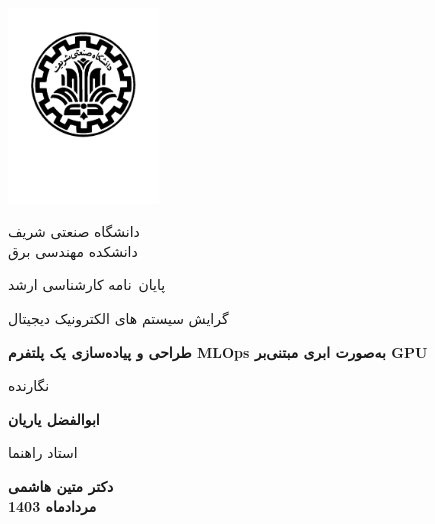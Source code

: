 

\thispagestyle{empty}
{\centering
	\mainjeldfont
	\vspace*{-2.5cm}
	\begin{latin}
		\centering
		\includegraphics[width=4cm]{Sharif_Logo.pdf}
	\end{latin}
	
	\vspace*{-2cm}
	
	{\Large دانشگاه صنعتی شریف \\ \vspace{0mm} \large دانشکده مهندسی برق}
	
	\vspace{1.4cm}
	
	{\large پایان~نامه کارشناسی ارشد\par} 
	{\large  گرایش سیستم های الکترونیک دیجیتال\par}  
	\vspace{1.3cm}
	{\Huge \textbf{طراحی و پیاده‌سازی یک پلتفرم MLOps به‌صورت ابری مبتنی‌بر GPU} }\par
	
	\vfil
	{\fieldnamefont نگارنده} \par
	{\Large\textbf{ابوالفضل یاریان}}
	
	\vfil
	{\fieldnamefont استاد راهنما} \par 
	{\Large\textbf{دکتر متین هاشمی}}\\
	
	
	
	\vfil
	{\textbf{مردادماه 1403}}
	
	
	
}